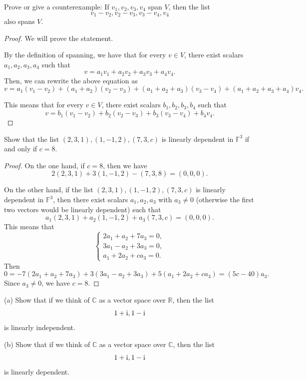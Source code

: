 \documentclass{article}
\begin{document}
\begin{problem}[2A-2]
    Prove or give a counterexample: If \( v_1, v_2, v_3, v_4 \) span \( V \), then the list
    \[
    v_1 - v_2, v_2 - v_3, v_3 - v_4, v_4
    \]
    also spans \( V \).
\end{problem}

\begin{proof}
    We will prove the statement. \par 
    By the definition of spanning, we have that for every \( v \in V \), there exist scalars \( a_1, a_2, a_3, a_4 \) such that
    \[ v= a_1 v_1 + a_2 v_2 + a_3 v_3 + a_4 v_4. \]
    Then, we can rewrite the above equation as
    \[ v= a_1 (v_1 - v_2) + (a_1 + a_2) (v_2 - v_3) + (a_1 + a_2 + a_3) (v_3 - v_4) + (a_1 + a_2 + a_3 + a_4) v_4. \]\par 
    This means that for every \( v \in V \), there exist scalars \( b_1, b_2, b_3, b_4 \) such that
    \[ v= b_1 (v_1 - v_2) + b_2 (v_2 - v_3) + b_3 (v_3 - v_4) + b_4 v_4. \]
\end{proof}

\begin{problem}[2A-6]
    Show that the list \( (2, 3, 1), (1, -1, 2), (7, 3, c) \) is linearly dependent in \( \mathbb{F}^3 \) if and only if \( c = 8 \).
\end{problem}

\begin{proof}
    On the one hand, if $ c=8 $, then we have
    \[ 2(2, 3, 1) + 3(1, -1, 2) - (7, 3, 8) = (0, 0, 0). \]\par 
    On the other hand, if the list \( (2, 3, 1), (1, -1, 2), (7, 3, c) \) is linearly dependent in \( \mathbb{F}^3 \), then there exist scalars \( a_1, a_2, a_3 \) with $ a_3\neq 0 $ (otherwise the first two vectors would be linearly dependent) such that
    \[ a_1 (2, 3, 1) + a_2 (1, -1, 2) + a_3 (7, 3, c) = (0, 0, 0). \]
    This means that 
    \[ \begin{cases}
    2 a_1 + a_2 + 7 a_3 = 0,  \\
    3 a_1 - a_2 + 3 a_3 = 0,  \\
    a_1 + 2 a_2 + c a_3 = 0.  
    \end{cases} \]
    Then
    \[ 0=-7(2 a_1 + a_2 + 7 a_3)+3(3 a_1 - a_2 + 3 a_3)+5(a_1 + 2 a_2 + c a_3)=(5c-40)a_3. \] 
    Since $ a_3\neq 0 $, we have $ c=8 $.
\end{proof}

\begin{problem}[2A-7]
    (a) Show that if we think of \(\mathbb{C}\) as a vector space over \(\mathbb{R}\), then the list  
    \[ 1 + \mathrm{i}, 1 - \mathrm{i} \] is linearly independent.

    (b) Show that if we think of \(\mathbb{C}\) as a vector space over \(\mathbb{C}\), then the list  
    \[ 1 + \mathrm{i}, 1 - \mathrm{i} \] is linearly dependent.
\end{problem}
\end{document}
